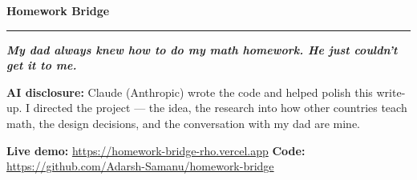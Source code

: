 \documentclass[9pt,letterpaper]{extarticle}
\begin{document}
{\fontsize{23}{25}\selectfont\bfseries Homework Bridge\par}
\vspace{1pt}
{\color{accent}\rule{\textwidth}{1.2pt}}
\vspace{4pt}

{\fontsize{13}{15}\selectfont\bfseries\itshape My dad always knew how to do my math homework. He just couldn't get it to me.\par}
\vspace{5pt}

\noindent\colorbox{accent}{\parbox{\dimexpr\textwidth-2\fboxsep}{\vspace{4pt}\large\color{white}%
\textbf{AI disclosure:} Claude (Anthropic) wrote the code and helped polish this write-up.
I directed the project --- the idea, the research into how other countries teach math, the
design decisions, and the conversation with my dad are mine.\vspace{4pt}}}
\vspace{3pt}

\noindent\colorbox{band}{\parbox{\dimexpr\textwidth-2\fboxsep}{\vspace{3pt}%
\textbf{Live demo:} \url{https://homework-bridge-rho.vercel.app} \hfill
\textbf{Code:} \url{https://github.com/Adarsh-Samanu/homework-bridge}\vspace{3pt}}}
\vspace{4pt}
\end{document}
